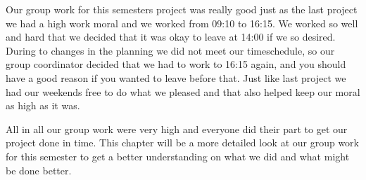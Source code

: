 Our group work for this semesters project was really good just as the last project we had a high work moral and we worked from 09:10 to 16:15. We worked so well and hard that we decided that it was okay to leave at 14:00 if we so desired. During to changes in the planning we did not meet our timeschedule, so our group coordinator decided that we had to work to 16:15 again, and you should have a good reason if you wanted to leave before that. 
Just like last project we had our weekends free to do what we pleased and that also helped keep our moral as high as it was.

All in all our group work were very high and everyone did their part to get our project done in time. 
This chapter will be a more detailed look at our group work for this semester to get a better understanding on what we did and what might be done better.